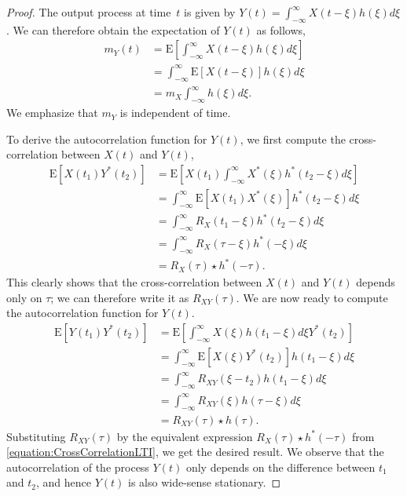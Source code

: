 \begin{proof}
The output process at time~$t$ is given by $Y(t) = \int_{-\infty}^{\infty} X(t - \xi) h(\xi) d\xi$.
We can therefore obtain the expectation of $Y(t)$ as follows,
\begin{equation*}
\begin{split}
m_Y (t) &= \mathrm{E} \left[ \int_{-\infty}^{\infty} X(t - \xi) h(\xi) d\xi \right] \\
&= \int_{-\infty}^{\infty} \mathrm{E} \left[ X(t - \xi) \right] h(\xi) d\xi \\
&= m_X \int_{-\infty}^{\infty} h(\xi) d\xi.
\end{split}
\end{equation*}
We emphasize that $m_Y$ is independent of time.

To derive the autocorrelation function for $Y(t)$, we first compute the cross-correlation between $X(t)$ and $Y(t)$,
\begin{equation} \label{equation:CrossCorrelationLTI}
\begin{split}
\mathrm{E} [X(t_1) Y^*(t_2) ]
&= \mathrm{E} \left[ X(t_1) \int_{-\infty}^{\infty} X^*(\xi) h^*(t_2 - \xi) d\xi \right] \\
&= \int_{-\infty}^{\infty} \mathrm{E} \left[ X(t_1) X^*(\xi) \right] h^*(t_2 - \xi) d\xi \\
&= \int_{-\infty}^{\infty} R_X(t_1 - \xi) h^*(t_2 - \xi) d\xi \\
&= \int_{-\infty}^{\infty} R_X(\tau - \xi) h^*(- \xi) d\xi \\
&= R_X(\tau) \star h^*(-\tau) .
\end{split}
\end{equation}
This clearly shows that the cross-correlation between $X(t)$ and $Y(t)$ depends only on $\tau$; we can therefore write it as $R_{XY}(\tau)$.
We are now ready to compute the autocorrelation function for $Y(t)$.
\begin{equation} \label{equation:AutoCorrelationLTI}
\begin{split}
\mathrm{E} [Y(t_1) Y^*(t_2) ]
&= \mathrm{E} \left[ \int_{-\infty}^{\infty} X(\xi) h(t_1 - \xi) d\xi Y^*(t_2) \right] \\
&= \int_{-\infty}^{\infty} \mathrm{E} \left[ X(\xi) Y^*(t_2) \right] h(t_1 - \xi) d\xi \\
&= \int_{-\infty}^{\infty} R_{XY}(\xi - t_2) h(t_1 - \xi) d\xi \\
&= \int_{-\infty}^{\infty} R_{XY}(\xi) h(\tau - \xi) d\xi \\
&= R_{XY}(\tau) \star h(\tau) .
\end{split}
\end{equation}
Substituting $R_{XY} (\tau)$ by the equivalent expression $R_X(\tau) \star h^*(-\tau)$ from \eqref{equation:CrossCorrelationLTI}, we get the desired result.
We observe that the autocorrelation of the process $Y(t)$ only depends on the difference between $t_1$ and $t_2$, and hence $Y(t)$ is also wide-sense stationary.
\end{proof}

